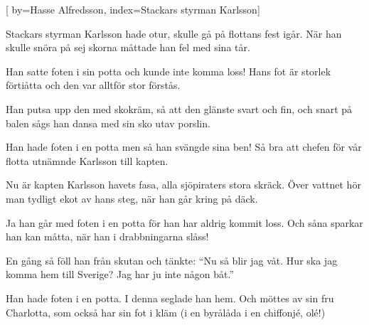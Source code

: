 


[ 	%
	by={Hasse Alfredsson},	%
	index={Stackars styrman Karlsson}]		%
	
\beginverse*		%
Stackars styrman Karlsson hade otur,
skulle gå på flottans fest igår.
När han skulle snöra på sej skorna
måttade han fel med sina tår.
\endverse			%

\beginverse*		%
Han satte foten i sin potta
och kunde inte komma loss!
Hans fot är storlek förtiåtta
och den var alltför stor förstås.
\endverse			%

\beginverse*		%
Han putsa upp den med skokräm,
så att den glänste svart och fin,
och snart på balen sågs han dansa
med sin sko utav porslin.
\endverse			%

\beginverse*		%
Han hade foten i en potta
men så han svängde sina ben!
Så bra att chefen för vår flotta
utnämnde Karlsson till kapten.
\endverse			%

\beginverse*		%
Nu är kapten Karlsson havets fasa,
alla sjöpiraters stora skräck.
Över vattnet hör man tydligt ekot
av hans steg, när han går kring på däck.
\endverse			%

\beginverse*		%
Ja han går med foten i en potta
för han har aldrig kommit loss.
Och såna sparkar han kan måtta,
när han i drabbningarna slåss!
\endverse			%

\beginverse*		%
En gång så föll han från skutan
och tänkte: ``Nu så blir jag våt.
Hur ska jag komma hem till Sverige?
Jag har ju inte någon båt.''
\endverse			%

\beginverse*		%
Han hade foten i en potta.
I denna seglade han hem.
Och möttes av sin fru Charlotta,
som också har sin fot i kläm
(i en byrålåda i en chiffonjé, olé!)
\endverse			%
\endsong			%
